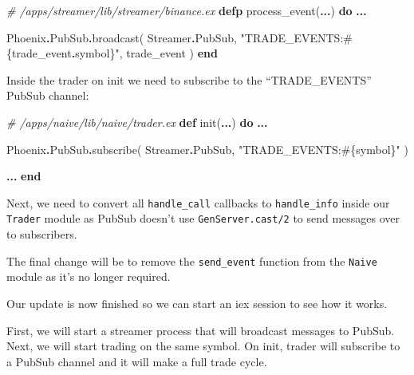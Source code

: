 \documentclass[
]{book}
\newenvironment{Shaded}{\begin{snugshade}}{\end{snugshade}}
\newcommand{\CommentTok}[1]{\textcolor[rgb]{0.56,0.35,0.01}{\textit{#1}}}
\newcommand{\ConstantTok}[1]{\textcolor[rgb]{0.00,0.00,0.00}{#1}}
\newcommand{\KeywordTok}[1]{\textcolor[rgb]{0.13,0.29,0.53}{\textbf{#1}}}
\newcommand{\NormalTok}[1]{#1}
\newcommand{\OperatorTok}[1]{\textcolor[rgb]{0.81,0.36,0.00}{\textbf{#1}}}
\newcommand{\OtherTok}[1]{\textcolor[rgb]{0.56,0.35,0.01}{#1}}
\newcommand{\StringTok}[1]{\textcolor[rgb]{0.31,0.60,0.02}{#1}}
\begin{document}
\begin{Shaded}
\begin{Highlighting}[]
\CommentTok{\# /apps/streamer/lib/streamer/binance.ex}
  \KeywordTok{defp}\NormalTok{ process\_event(}\OperatorTok{...}\NormalTok{) }\KeywordTok{do}
    \OperatorTok{...}

    \ConstantTok{Phoenix}\OperatorTok{.}\ConstantTok{PubSub}\OperatorTok{.}\NormalTok{broadcast(}
      \ConstantTok{Streamer}\OperatorTok{.}\ConstantTok{PubSub}\NormalTok{,}
      \StringTok{"TRADE\_EVENTS:}\OtherTok{\#\{}\NormalTok{trade\_event}\OperatorTok{.}\NormalTok{symbol}\OtherTok{\}}\StringTok{"}\NormalTok{,}
\NormalTok{      trade\_event}
\NormalTok{    )}
  \KeywordTok{end}
\end{Highlighting}
\end{Shaded}

Inside the trader on init we need to subscribe to the ``TRADE\_EVENTS'' PubSub channel:

\begin{Shaded}
\begin{Highlighting}[]
\CommentTok{\# /apps/naive/lib/naive/trader.ex}
  \KeywordTok{def}\NormalTok{ init(}\OperatorTok{...}\NormalTok{) }\KeywordTok{do}
    \OperatorTok{...}

    \ConstantTok{Phoenix}\OperatorTok{.}\ConstantTok{PubSub}\OperatorTok{.}\NormalTok{subscribe(}
      \ConstantTok{Streamer}\OperatorTok{.}\ConstantTok{PubSub}\NormalTok{,}
      \StringTok{"TRADE\_EVENTS:}\OtherTok{\#\{}\NormalTok{symbol}\OtherTok{\}}\StringTok{"}
\NormalTok{    )}

    \OperatorTok{...}
  \KeywordTok{end}
\end{Highlighting}
\end{Shaded}

Next, we need to convert all \texttt{handle\_call} callbacks to \texttt{handle\_info} inside our \texttt{Trader} module as PubSub doesn't use \texttt{GenServer.cast/2} to send messages over to subscribers.

The final change will be to remove the \texttt{send\_event} function from the \texttt{Naive}
module as it's no longer required.

Our update is now finished so we can start an iex session to see how it works.

First, we will start a streamer process that will broadcast messages
to PubSub. Next, we will start trading on the same symbol. On init, trader will subscribe to a PubSub channel and it will make a full trade cycle.
\end{document}
